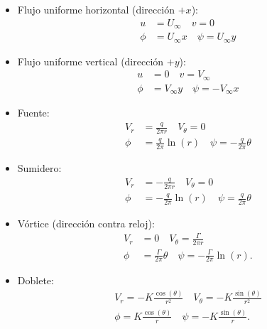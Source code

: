 \begin{itemize}
\item Flujo uniforme horizontal (dirección $+x$):
\begin{align}
u &= U_\infty \quad v = 0 \nonumber \\
\phi&= U_\infty x \quad \psi= U_\infty y
\end{align}

\item Flujo uniforme vertical (dirección $+y$):
\begin{align}
u &= 0 \quad v = V_\infty \nonumber \\
\phi&= V_\infty y \quad \psi= -V_\infty x
\end{align}

\item Fuente:
\begin{align}
V_r &= \frac{q}{2\pi r}\quad V_\theta=0\nonumber\\
\phi&=\frac{q}{2\pi}\ln(r) \quad \psi=-\frac{q}{2\pi}\theta
\end{align}

\item Sumidero:
\begin{align}
V_r &= -\frac{q}{2\pi r}\quad V_\theta=0\nonumber\\
\phi&=-\frac{q}{2\pi}\ln(r) \quad \psi=\frac{q}{2\pi}\theta
\end{align}

\item Vórtice (dirección contra reloj):
\begin{align}
V_r &= 0 \quad V_\theta=\frac{\Gamma}{2\pi r}\nonumber\\
\phi&=\frac{\Gamma}{2\pi}\theta \quad \psi = -\frac{\Gamma}{2\pi}\ln(r).
\end{align}

\item Doblete: 
\begin{align}
V_r = -K\frac{\cos(\theta)}{r^2}\quad V_\theta = -K\frac{\sin(\theta)}{r^2}\nonumber\\
\phi=K\frac{\cos(\theta)}{r}\quad \psi = -K\frac{\sin(\theta)}{r}.
\end{align}

\end{itemize}

